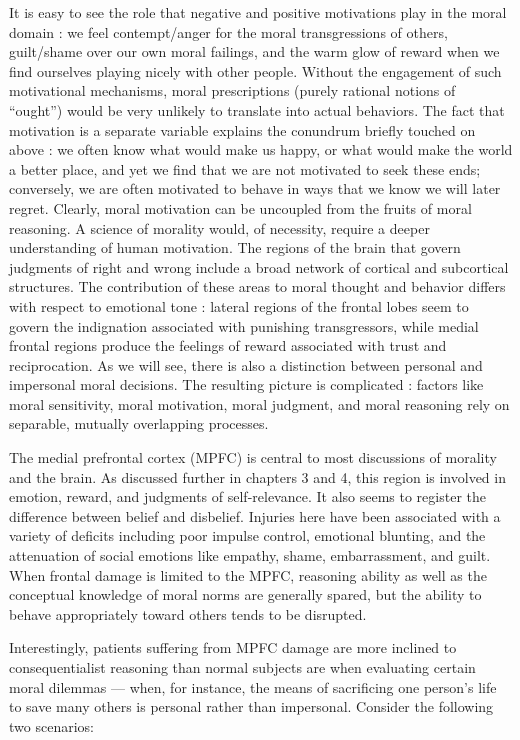 \documentclass[a4paper,14pt]{extarticle}
\begin{document}
It is easy to see the role that negative and positive motivations play in the moral domain :
we feel contempt/anger for the moral transgressions of others, guilt/shame over our own moral failings, and the warm glow of reward when we find ourselves playing nicely with other people.
Without the engagement of such motivational mechanisms, moral prescriptions (purely rational notions of ``ought'') would be very unlikely to translate into actual behaviors.
The fact that motivation is a separate variable explains the conundrum briefly touched on above :
we often know what would make us happy, or what would make the world a better place, and yet we find that we are not motivated to seek these ends;
conversely, we are often motivated to behave in ways that we know we will later regret.
Clearly, moral motivation can be uncoupled from the fruits of moral reasoning.
A science of morality would, of necessity, require a deeper understanding of human motivation.
The regions of the brain that govern judgments of right and wrong include a broad network of cortical and subcortical structures.
The contribution of these areas to moral thought and behavior differs with respect to emotional tone :
lateral regions of the frontal lobes seem to govern the indignation associated with punishing transgressors, while medial frontal regions produce the feelings of reward associated with trust and reciprocation.
As we will see, there is also a distinction between personal and impersonal moral decisions.
The resulting picture is complicated :
factors like moral sensitivity, moral motivation, moral judgment, and moral reasoning rely on separable, mutually overlapping processes.

The medial prefrontal cortex (MPFC) is central to most discussions of morality and the brain.
As discussed further in chapters 3 and 4, this region is involved in emotion, reward, and judgments of self-relevance.
It also seems to register the difference between belief and disbelief.
Injuries here have been associated with a variety of deficits including poor impulse control, emotional blunting, and the attenuation of social emotions like empathy, shame, embarrassment, and guilt.
When frontal damage is limited to the MPFC, reasoning ability as well as the conceptual knowledge of moral norms are generally spared, but the ability to behave appropriately toward others tends to be disrupted.

Interestingly, patients suffering from MPFC damage are more inclined to consequentialist reasoning than normal subjects are when evaluating certain moral dilemmas --- when, for instance, the means of sacrificing one person's life to save many others is personal rather than impersonal.
Consider the following two scenarios:
\end{document}
